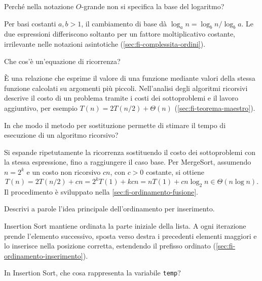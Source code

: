 \begin{exercise}
\label{ex:fi-esercizi-ricerca-ordinamento-base-logaritmo}
Perché nella notazione \(O\)-grande non si specifica
la base del logaritmo?
\end{exercise}

Per basi costanti \(a,b>1\), il cambiamento di base dà
\(\log_a n=\log_b n/\log_b a\). Le due espressioni differiscono
soltanto per un fattore moltiplicativo costante, irrilevante
nelle notazioni asintotiche
(\cref{sec:fi-complessita-ordini}).

\begin{exercise}
\label{ex:fi-esercizi-ricerca-ordinamento-ricorrenza}
Che cos'è un'equazione di ricorrenza?
\end{exercise}

È una relazione che esprime il valore di una funzione mediante
valori della stessa funzione calcolati su argomenti più piccoli.
Nell'analisi degli algoritmi ricorsivi descrive il costo di
un problema tramite i costi dei sottoproblemi e il lavoro
aggiuntivo, per esempio \(T(n)=2T(n/2)+\Theta(n)\)
(\cref{sec:fi-teorema-maestro}).

\begin{exercise}
\label{ex:fi-esercizi-ricerca-ordinamento-sostituzione}
In che modo il metodo per sostituzione permette di stimare
il tempo di esecuzione di un algoritmo ricorsivo?
\end{exercise}

Si espande ripetutamente la ricorrenza sostituendo il costo
dei sottoproblemi con la stessa espressione, fino a raggiungere
il caso base. Per MergeSort, assumendo \(n=2^k\) e un costo
non ricorsivo \(cn\), con \(c>0\) costante, si ottiene
\[
  T(n)=2T(n/2)+cn
      =2^kT(1)+kcn
      =nT(1)+cn\log_2 n
      \in\Theta(n\log n).
\]
Il procedimento è sviluppato nella
\cref{sec:fi-ordinamento-fusione}.

\begin{exercise}
\label{ex:fi-esercizi-ricerca-ordinamento-inserimento-idea}
Descrivi a parole l'idea principale dell'ordinamento
per inserimento.
\end{exercise}

Insertion Sort mantiene ordinata la parte iniziale della lista.
A ogni iterazione prende l'elemento successivo, sposta verso
destra i precedenti elementi maggiori e lo inserisce nella
posizione corretta, estendendo il prefisso ordinato
(\cref{sec:fi-ordinamento-inserimento}).

\begin{exercise}
\label{ex:fi-esercizi-ricerca-ordinamento-inserimento-temp}
In Insertion Sort, che cosa rappresenta la variabile
\texttt{temp}?
\end{exercise}

